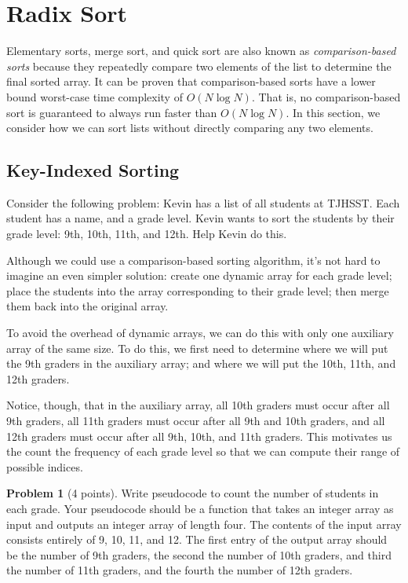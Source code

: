 \documentclass{exam}
\theoremstyle{definition}
\newtheorem{problem}{Problem}[section]
\theoremstyle{definition}
\begin{document}
\section{Radix Sort}

Elementary sorts, merge sort, and quick sort are also known as \textit{comparison-based sorts} because they repeatedly compare two elements of the list to determine the final sorted array. It can be proven that comparison-based sorts have a lower bound worst-case time complexity of $O(N \log N)$. That is, no comparison-based sort is guaranteed to always run faster than $O(N \log N)$. In this section, we consider how we can sort lists without directly comparing any two elements. 



\subsection{Key-Indexed Sorting}

Consider the following problem: Kevin has a list of all students at TJHSST. Each student has a name, and a grade level. Kevin wants to sort the students by their grade level: 9th, 10th, 11th, and 12th. Help Kevin do this.

Although we could use a comparison-based sorting algorithm, it's not hard to imagine an even simpler solution: create one dynamic array for each grade level; place the students into the array corresponding to their grade level; then merge them back into the original array.

To avoid the overhead of dynamic arrays, we can do this with only one auxiliary array of the same size. To do this, we first need to determine where we will put the 9th graders in the auxiliary array; and where we will put the 10th, 11th, and 12th graders. 

Notice, though, that in the auxiliary array, all 10th graders must occur after all 9th graders, all 11th graders must occur after all 9th and 10th graders, and all 12th graders must occur after all 9th, 10th, and 11th graders. This motivates us the count the frequency of each grade level so that we can compute their range of possible indices. 

\begin{problem}[4 points]
    Write pseudocode to count the number of students in each grade. Your pseudocode should be a function that takes an integer array as input and outputs an integer array of length four. The contents of the input array consists entirely of 9, 10, 11, and 12. The first entry of the output array should be the number of 9th graders, the second the number of 10th graders, and third the number of 11th graders, and the fourth the number of 12th graders. 
\end{problem}
\end{document}
